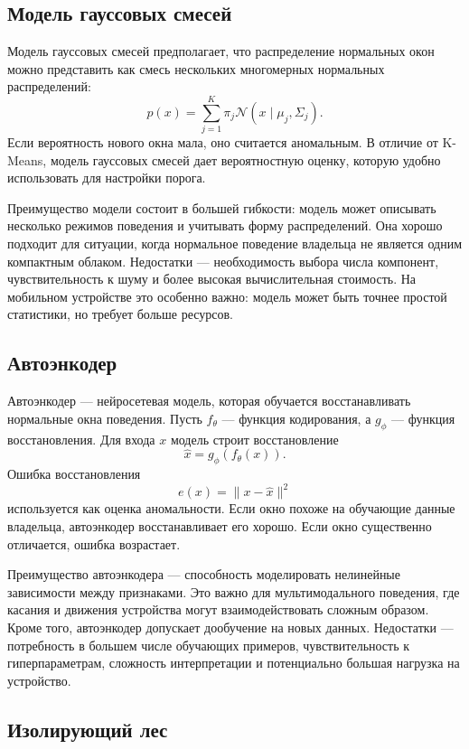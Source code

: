 \documentclass[oneside,senior,etd]{BYUPhys}
\begin{document}
\subsection{Модель гауссовых смесей}

Модель гауссовых смесей предполагает, что распределение нормальных окон можно представить как смесь нескольких многомерных нормальных распределений:
\[
    p(x)=\sum_{j=1}^{K}\pi_j \mathcal{N}(x\mid \mu_j,\Sigma_j).
\]
Если вероятность нового окна мала, оно считается аномальным. В отличие от K-Means, модель гауссовых смесей дает вероятностную оценку, которую удобно использовать для настройки порога.

Преимущество модели состоит в большей гибкости: модель может описывать несколько режимов поведения и учитывать форму распределений. Она хорошо подходит для ситуации, когда нормальное поведение владельца не является одним компактным облаком. Недостатки --- необходимость выбора числа компонент, чувствительность к шуму и более высокая вычислительная стоимость. На мобильном устройстве это особенно важно: модель может быть точнее простой статистики, но требует больше ресурсов.

\subsection{Автоэнкодер}

Автоэнкодер --- нейросетевая модель, которая обучается восстанавливать нормальные окна поведения. Пусть $f_\theta$ --- функция кодирования, а $g_\phi$ --- функция восстановления. Для входа $x$ модель строит восстановление
\[
    \hat{x}=g_\phi(f_\theta(x)).
\]
Ошибка восстановления
\[
    e(x)=\|x-\hat{x}\|^2
\]
используется как оценка аномальности. Если окно похоже на обучающие данные владельца, автоэнкодер восстанавливает его хорошо. Если окно существенно отличается, ошибка возрастает.

Преимущество автоэнкодера --- способность моделировать нелинейные зависимости между признаками. Это важно для мультимодального поведения, где касания и движения устройства могут взаимодействовать сложным образом. Кроме того, автоэнкодер допускает дообучение на новых данных. Недостатки --- потребность в большем числе обучающих примеров, чувствительность к гиперпараметрам, сложность интерпретации и потенциально большая нагрузка на устройство.

\subsection{Изолирующий лес}
\end{document}
